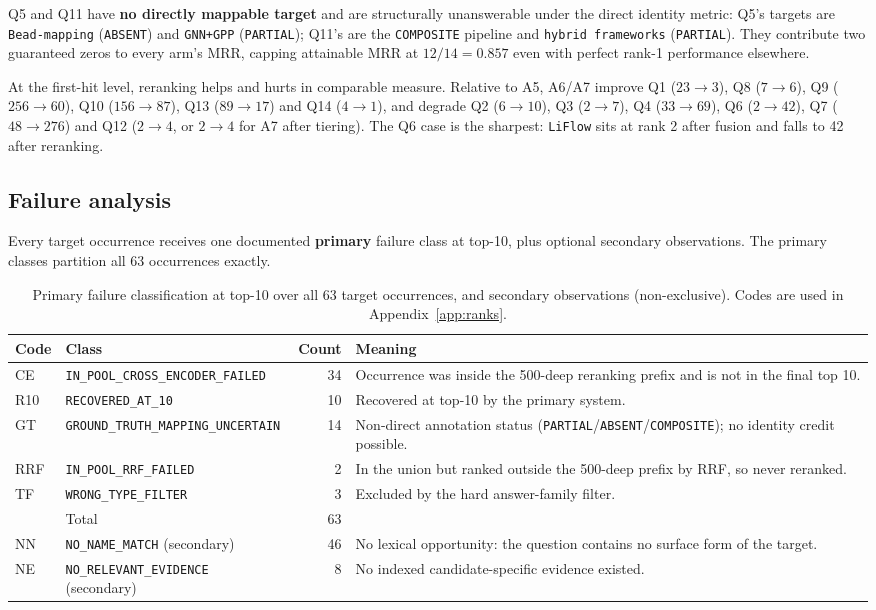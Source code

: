 \documentclass[11pt,a4paper]{article}
\begin{document}
Q5 and Q11 have \textbf{no directly mappable target} and are structurally unanswerable under the direct
identity metric: Q5's targets are \texttt{Bead-mapping} (\texttt{ABSENT}) and \texttt{GNN+GPP}
(\texttt{PARTIAL}); Q11's are the \texttt{COMPOSITE} pipeline and \texttt{hybrid frameworks}
(\texttt{PARTIAL}). They contribute two guaranteed zeros to every arm's MRR, capping attainable MRR at
$12/14 = 0.857$ even with perfect rank-1 performance elsewhere.

At the first-hit level, reranking helps and hurts in comparable measure. Relative to A5, A6/A7 improve Q1
($23 \to 3$), Q8 ($7 \to 6$), Q9 ($256 \to 60$), Q10 ($156 \to 87$), Q13 ($89 \to 17$) and Q14 ($4 \to 1$),
and degrade Q2 ($6 \to 10$), Q3 ($2 \to 7$), Q4 ($33 \to 69$), Q6 ($2 \to 42$), Q7 ($48 \to 276$) and Q12
($2 \to 4$, or $2 \to 4$ for A7 after tiering). The Q6 case is the sharpest: \texttt{LiFlow} sits at rank 2
after fusion and falls to 42 after reranking.

\subsection{Failure analysis}
\label{sec:fail}

Every target occurrence receives one documented \textbf{primary} failure class at top-10, plus optional
secondary observations. The primary classes partition all 63 occurrences exactly.

\begin{table}[htbp]
\centering
\small
\caption{Primary failure classification at top-10 over all 63 target occurrences, and secondary
observations (non-exclusive). Codes are used in Appendix~\ref{app:ranks}.}
\label{tab:fail}
\begin{tabular}{llrp{7.0cm}}
\toprule
Code & Class & Count & Meaning \\
\midrule
CE  & \texttt{IN\_POOL\_CROSS\_ENCODER\_FAILED} & 34 & Occurrence was inside the 500-deep reranking prefix and is not in the final top 10. \\
R10 & \texttt{RECOVERED\_AT\_10} & 10 & Recovered at top-10 by the primary system. \\
GT  & \texttt{GROUND\_TRUTH\_MAPPING\_UNCERTAIN} & 14 & Non-direct annotation status (\texttt{PARTIAL}/\texttt{ABSENT}/\texttt{COMPOSITE}); no identity credit possible. \\
RRF & \texttt{IN\_POOL\_RRF\_FAILED} & 2 & In the union but ranked outside the 500-deep prefix by RRF, so never reranked. \\
TF  & \texttt{WRONG\_TYPE\_FILTER} & 3 & Excluded by the hard answer-family filter. \\
\midrule
    & Total & 63 & \\
\midrule
NN  & \texttt{NO\_NAME\_MATCH} (secondary) & 46 & No lexical opportunity: the question contains no surface form of the target. \\
NE  & \texttt{NO\_RELEVANT\_EVIDENCE} (secondary) & 8 & No indexed candidate-specific evidence existed. \\
\bottomrule
\end{tabular}
\end{table}
\end{document}
